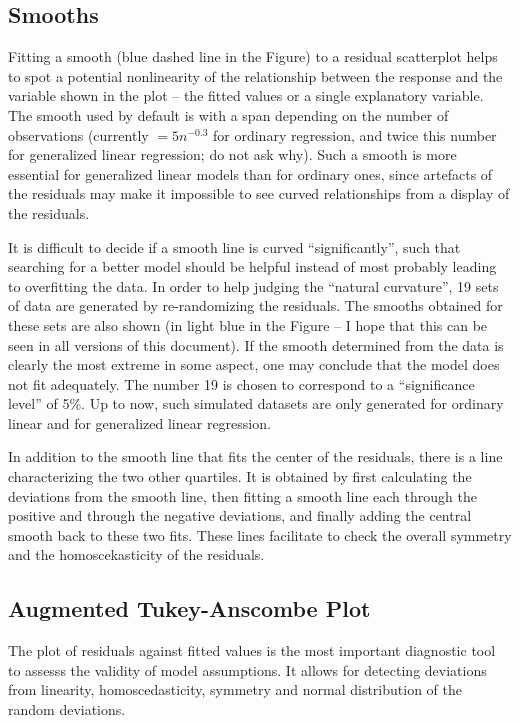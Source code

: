 \documentclass[11pt]{article}
\begin{document}
\subsection{Smooths}
Fitting a smooth (blue dashed line in the Figure) 
to a residual scatterplot helps to spot a potential
nonlinearity of the relationship between the response and the variable
shown in the plot -- the fitted values or a single explanatory variable.
The smooth used by default is  with a span depending on the number
of observations (currently $= 5n^{-0.3}$ for ordinary regression, and twice 
this number for generalized linear regression; do not ask why).
Such a smooth is more essential for generalized linear models than for 
ordinary ones, since artefacts of the residuals may make it impossible to 
see curved relationships from a display of the residuals.

It is difficult to decide if a smooth line is curved ``significantly'',
such that searching for a better model should be helpful instead of most
probably leading to overfitting the data.
In order to help judging the ``natural curvature'', 19 sets of data are
generated by 
re-randomizing the residuals. 
The smooths obtained for these sets are also shown (in light blue in the
Figure -- I hope that this can be seen in all versions of this document).
If the smooth determined from the data is clearly the most extreme in some
aspect, one may conclude that the model does not fit adequately.
The number 19 is chosen to correspond to a ``significance level'' of 5\%.
Up to now, such simulated datasets are only generated for ordinary linear
and for generalized linear regression. 

In addition to the smooth line that fits the center of the residuals,
there is a line characterizing the two other quartiles. 
It is obtained by first calculating the deviations from the smooth line,
then fitting a smooth line each through the positive and through the
negative deviations, and finally adding the central smooth back to these
two fits.
These lines facilitate to check the overall symmetry and the
homoscekasticity of the residuals.

\subsection{Augmented Tukey-Anscombe Plot}
The plot of residuals against fitted values is the most important
diagnostic tool to assesss the validity of model assumptions.
It allows for detecting deviations from linearity, homoscedasticity,
symmetry and normal distribution of the random deviations.
\end{document}
